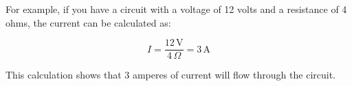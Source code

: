 For example, if you have a circuit with a voltage of 12 volts and a resistance of 4 ohms, the current can be calculated as:

\[
I = \frac{12\, \text{V}}{4\, \Omega} = 3\, \text{A}
\]

This calculation shows that 3 amperes of current will flow through the circuit.

